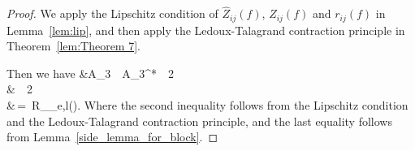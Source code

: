 \documentclass[twoside,11pt]{article}
\begin{document}
\begin{proof}
We apply the Lipschitz condition of $\hat Z_{ij}(f)$, $Z_{ij}(f)$ and $r_{ij}(f)$ in Lemma~\ref{lem:lip}, and then apply the 
Ledoux-Talagrand contraction principle in Theorem~\ref{lem:Theorem 7}. 


Then we have
\beq
&A_3 \,\le\, A_3^* \,\le\, 2 \\
& \,\le\, 2 \\
&\,=\, R_{_{e,l}}(\gF \cap {}).
\beq
Where the second inequality follows from the Lipschitz condition and the Ledoux-Talagrand contraction principle, and the last equality follows from Lemma~\ref{side_lemma_for_block}.
\end{proof}




\end{document}
